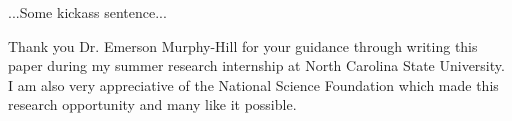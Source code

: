 \documentclass{sigplanconf}
\begin{document}
...Some kickass sentence...  

\appendix
% 

\acks
Thank you Dr. Emerson Murphy-Hill for your guidance through writing this
paper during my summer research internship at North Carolina State University.
I am also very appreciative of the National Science Foundation which made this
research opportunity and many like it possible.





\softraggedright

\end{document}
